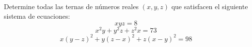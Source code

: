 Determine todas las ternas de números reales $(x,y,z)$ que satisfacen el siguiente sistema de ecuaciones:
\[ xyz = 8 \]
\[ x^2 y + y^2 z + z^2 x = 73 \]
\[ x(y-z)^2 + y(z-x)^2 + z(x-y)^2 = 98 \]

